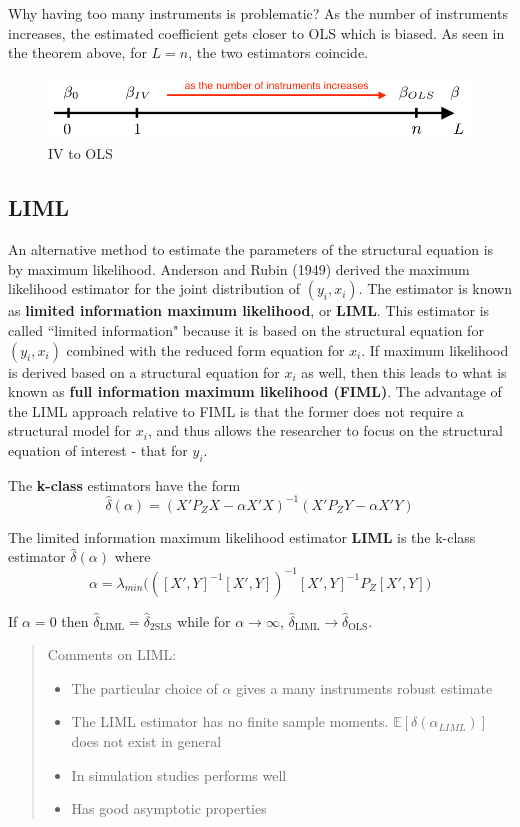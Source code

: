 \documentclass[12pt,]{book}
\providecommand{\tightlist}{%
  \setlength{\itemsep}{0pt}\setlength{\parskip}{0pt}}
\begin{document}
Why having too many instruments is problematic? As the number of instruments increases, the estimated coefficient gets closer to OLS which is biased. As seen in the theorem above, for \(L=n\), the two estimators coincide.

\begin{figure}
\centering
\includegraphics{figures/Fig_451.png}
\caption{IV to OLS}
\end{figure}

\hypertarget{liml}{%
\subsection{LIML}\label{liml}}

An alternative method to estimate the parameters of the structural equation is by maximum likelihood. Anderson and Rubin (1949) derived the maximum likelihood estimator for the joint distribution of \((y_i, x_i)\). The estimator is known as \textbf{limited information maximum likelihood}, or \textbf{LIML}.
This estimator is called ``limited information" because it is based on the structural equation for \((y_i, x_i)\) combined with the reduced form equation for \(x_i\). If maximum likelihood is derived based on a structural equation for \(x_i\) as well, then this leads to what is known as \textbf{full information maximum likelihood (FIML)}. The advantage of the LIML approach relative to FIML is that the former does not require a structural model for \(x_i\), and thus allows the researcher to focus on the structural equation of interest - that for \(y_i\).

The \textbf{k-class} estimators have the form
\[
    \hat{\delta}(\alpha) = (X' P_Z X - \alpha X' X)^{-1} (X' P_Z Y - \alpha X' Y) 
\]

The limited information maximum likelihood estimator \textbf{LIML} is the k-class estimator \(\hat{\delta}(\alpha)\) where
\[
    \alpha = \lambda_{min} \Big( ([X' , Y]^{-1} [X' , Y])^{-1} [X' , Y]^{-1} P_Z [X' , Y] \Big) 
\]

If \(\alpha = 0\) then \(\hat{\delta} _ {\text{LIML}} = \hat{\delta} _ {\text{2SLS}}\) while for \(\alpha \to \infty\), \(\hat{\delta} _ {\text{LIML}} \to \hat{\delta} _ {\text{OLS}}\).

\begin{quote}
Comments on LIML:

\begin{itemize}
\tightlist
\item
  The particular choice of \(\alpha\) gives a many instruments robust estimate
\item
  The LIML estimator has no finite sample moments. \(\mathbb E[\delta(\alpha_{LIML})]\) does not exist in general
\item
  In simulation studies performs well
\item
  Has good asymptotic properties
\end{itemize}
\end{quote}
\end{document}
